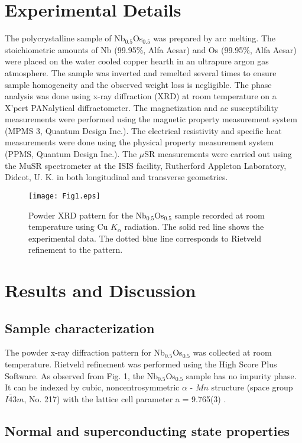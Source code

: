 \documentclass[reprint, superscriptaddress, secnumarabic, amssymb, nobibnotes, aps, prl]{revtex4-1}
\begin{document}
\section{Experimental Details}
The polycrystalline sample of Nb$_{0.5}$Os$_{0.5}$ was prepared by arc melting. The stoichiometric amounts of Nb (99.95$\%$, Alfa Aesar) and Os (99.95$\%$, Alfa Aesar) were placed on the water cooled copper hearth in an ultrapure argon gas atmosphere. The sample was inverted and remelted several times to ensure sample homogeneity and the observed weight loss is negligible. The phase analysis was done using x-ray diffraction (XRD) at room temperature on a X'pert PANalytical diffractometer. The magnetization and ac susceptibility measurements were performed using the magnetic property measurement system (MPMS 3, Quantum Design Inc.). The electrical resistivity and specific heat measurements were done using the physical property measurement system (PPMS, Quantum Design Inc.).
The $\mu$SR measurements were carried out using the MuSR spectrometer at the ISIS facility, Rutherford Appleton Laboratory, Didcot, U. K. in both longitudinal and transverse geometries.
\begin{figure}
\texttt{[image: Fig1.eps]}
\caption{\label{Fig1:xrd} Powder XRD pattern for the Nb$_{0.5}$Os$_{0.5}$ sample recorded at room temperature using Cu $K_{\alpha}$ radiation. The solid red line shows the experimental data. The dotted blue line corresponds to Rietveld refinement to the pattern.}
\end{figure}
\section{Results and Discussion}
\subsection{Sample characterization}
The powder x-ray diffraction pattern for Nb$_{0.5}$Os$_{0.5}$ was collected at room temperature. Rietveld refinement was performed using the High Score Plus Software. As observed from Fig. 1, the Nb$_{0.5}$Os$_{0.5}$ sample has no impurity phase. It can be indexed by cubic, noncentrosymmetric $\alpha$ - $Mn$ structure (space group $I \bar{4}3m$, No. 217) with the lattice cell parameter a = 9.765(3) \text{\AA}.
\subsection{Normal and superconducting state properties}
\end{document}
